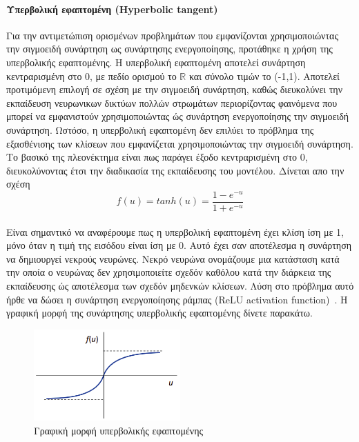 \documentclass[12pt]{article}
\numberwithin{equation}{section}
\begin{document}
\paragraph{Υπερβολική εφαπτομένη (Hyperbolic tangent)\\[0.5cm]}

Για την αντιμετώπιση ορισμένων προβλημάτων που εμφανίζονται χρησιμοποιώντας την σιγμοειδή συνάρτηση ως συνάρτησης ενεργοποίησης, προτάθηκε η χρήση της υπερβολικής εφαπτομένης. Η υπερβολική εφαπτομένη αποτελεί συνάρτηση κεντραρισμένη στο 0, με πεδίο ορισμού το \(\mathbb{R}\) και σύνολο τιμών το (-1,1). Αποτελεί προτιμόμενη επιλογή σε σχέση με την σιγμοειδή συνάρτηση, καθώς διευκολύνει την εκπαίδευση νευρωνικων δικτύων πολλών στρωμάτων περιορίζοντας φαινόμενα που μπορεί να εμφανιστούν χρησιμοποιώντας ώς συνάρτηση ενεργοποίησης την σιγμοειδή συνάρτηση. Ωστόσο, η υπερβολική εφαπτομένη δεν επιλύει το πρόβλημα της εξασθένισης των κλίσεων που εμφανίζεται χρησιμοποιώντας την σιγμοειδή συνάρτηση. Το βασικό της πλεονέκτημα είναι πως παράγει έξοδο κεντραρισμένη στο 0, διευκολύνοντας έτσι την διαδικασία της εκπαίδευσης του μοντέλου. Δίνεται απο την σχέση \\

\begin{equation}
f(u) = tanh(u) = \frac{1 - e^{-u}}{1 + e^{-u}}
\end{equation}\\

Είναι σημαντικό να αναφέρουμε πως η υπερβολική εφαπτομένη έχει κλίση ίση με 1, μόνο όταν η τιμή της εισόδου είναι ίση με 0. Αυτό έχει σαν αποτέλεσμα η συνάρτηση να δημιουργεί νεκρούς νευρώνες. Νεκρό νευρώνα ονομάζουμε μια κατάσταση κατά την οποία ο νευρώνας δεν χρησιμοποιείτε σχεδόν καθόλου κατά την διάρκεια της εκπαίδευσης ώς αποτέλεσμα των σχεδόν μηδενκών κλίσεων. Λύση στο πρόβλημα αυτό ήρθε να δώσει η συνάρτηση ενεργοποίησης ράμπας (ReLU activation function)~\cite{nwankpa2018activationfunctionscomparisontrends}. Η γραφική μορφή της συνάρτησης υπερβολικής εφαπτομένης δίνετε παρακάτω.\\

\begin{figure}[h!]
  \centering
  \includegraphics[width=0.5\textwidth]{images/Tanh.png} %
  \caption{Γραφική μορφή υπερβολικής εφαπτομένης}
  \label{figure 13}
\end{figure} 
\end{document}
